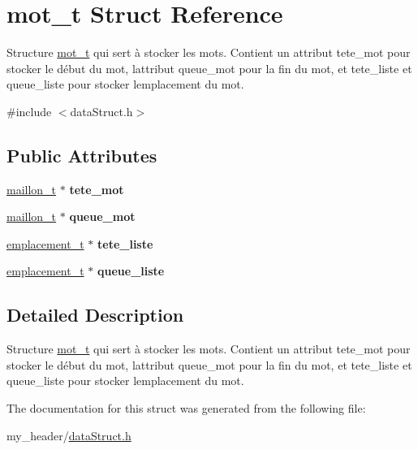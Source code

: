 \hypertarget{structmot__t}{}\section{mot\+\_\+t Struct Reference}
\label{structmot__t}


Structure \mbox{\hyperlink{structmot__t}{mot\+\_\+t}} qui sert à stocker les mots. Contient un attribut tete\+\_\+mot pour stocker le début du mot, l\textquotesingle{}attribut queue\+\_\+mot pour la fin du mot, et tete\+\_\+liste et queue\+\_\+liste pour stocker l\textquotesingle{}emplacement du mot.  




{\ttfamily \#include $<$data\+Struct.\+h$>$}

\subsection*{Public Attributes}
\begin{DoxyCompactItemize}
\item 
\mbox{\label{structmot__t_a9ae122d6923b7edc52d76561288d774c}} 
\mbox{\hyperlink{structmaillon__t}{maillon\+\_\+t}} $\ast$ {\bfseries tete\+\_\+mot}
\item 
\mbox{\label{structmot__t_ae1f8cbcdeabbbc18333f85bd479ed58c}} 
\mbox{\hyperlink{structmaillon__t}{maillon\+\_\+t}} $\ast$ {\bfseries queue\+\_\+mot}
\item 
\mbox{\label{structmot__t_a05a406093ffeeea5fe0f1ee76d58d30d}} 
\mbox{\hyperlink{structemplacement__t}{emplacement\+\_\+t}} $\ast$ {\bfseries tete\+\_\+liste}
\item 
\mbox{\label{structmot__t_a72542a466bf2c69d7df8d9c0fe9b361c}} 
\mbox{\hyperlink{structemplacement__t}{emplacement\+\_\+t}} $\ast$ {\bfseries queue\+\_\+liste}
\end{DoxyCompactItemize}


\subsection{Detailed Description}
Structure \mbox{\hyperlink{structmot__t}{mot\+\_\+t}} qui sert à stocker les mots. Contient un attribut tete\+\_\+mot pour stocker le début du mot, l\textquotesingle{}attribut queue\+\_\+mot pour la fin du mot, et tete\+\_\+liste et queue\+\_\+liste pour stocker l\textquotesingle{}emplacement du mot. 

The documentation for this struct was generated from the following file\+:\begin{DoxyCompactItemize}
\item 
my\+\_\+header/\mbox{\hyperlink{dataStruct_8h}{data\+Struct.\+h}}\end{DoxyCompactItemize}
